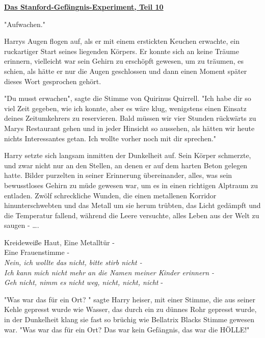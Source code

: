 

\hypertarget{das-stanford-gefuxe4ngnis-experiment-teil-10}{%

\textbf{\uline{Das Stanford-Gefängnis-Experiment, Teil 10}}

"Aufwachen."

Harrys Augen flogen auf, als er mit einem erstickten Keuchen erwachte, ein ruckartiger Start seines liegenden Körpers. Er konnte sich an keine Träume erinnern, vielleicht war sein Gehirn zu erschöpft gewesen, um zu träumen, es schien, als hätte er nur die Augen geschlossen und dann einen Moment später dieses Wort gesprochen gehört.

"Du musst erwachen", sagte die Stimme von Quirinus Quirrell. "Ich habe dir so viel Zeit gegeben, wie ich konnte, aber es wäre klug, wenigstens einen Einsatz deines Zeitumkehrers zu reservieren. Bald müssen wir vier Stunden rückwärts zu Marys Restaurant gehen und in jeder Hinsicht so aussehen, als hätten wir heute nichts Interessantes getan. Ich wollte vorher noch mit dir sprechen."

Harry setzte sich langsam inmitten der Dunkelheit auf. Sein Körper schmerzte, und zwar nicht nur an den Stellen, an denen er auf dem harten Beton gelegen hatte. Bilder purzelten in seiner Erinnerung übereinander, alles, was sein bewusstloses Gehirn zu müde gewesen war, um es in einen richtigen Alptraum zu entladen. Zwölf schreckliche Wunden, die einen metallenen Korridor hinunterschwebten und das Metall um sie herum trübten, das Licht gedämpft und die Temperatur fallend, während die Leere versuchte, alles Leben aus der Welt zu saugen - ….

Kreideweiße Haut, Eine Metalltür -\\ Eine Frauenstimme -\\ \emph{Nein, ich wollte das nicht, bitte stirb nicht -\\ Ich kann mich nicht mehr an die Namen meiner Kinder erinnern -\\ Geh nicht, nimm es nicht weg, nicht, nicht, nicht} -

"Was war das für ein Ort? " sagte Harry heiser, mit einer Stimme, die aus seiner Kehle gepresst wurde wie Wasser, das durch ein zu dünnes Rohr gepresst wurde, in der Dunkelheit klang sie fast so brüchig wie Bellatrix Blacks Stimme gewesen war. "Was war das für ein Ort? Das war kein Gefängnis, das war die HÖLLE!"

}

